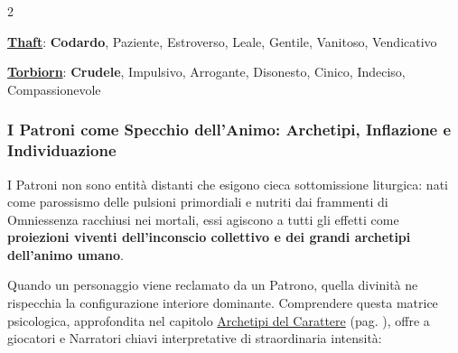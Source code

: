 \begin{multicols}{2}
{\smallskip
\textbf{\hyperlink{thaft}{Thaft}}: \textbf{Codardo}, Paziente, Estroverso, Leale, Gentile, Vanitoso, Vendicativo

\smallskip
\textbf{\hyperlink{torbiorn}{Torbiorn}}: \textbf{Crudele}, Impulsivo, Arrogante, Disonesto, Cinico, Indeciso, Compassionevole

}

\subsubsection{I Patroni come Specchio dell'Animo: Archetipi, Inflazione e Individuazione}\label{patroni-psicologia}\hypertarget{patroni-psicologia}{}

I Patroni non sono entità distanti che esigono cieca sottomissione liturgica: nati come parossismo delle pulsioni primordiali e nutriti dai frammenti di Omniessenza racchiusi nei mortali, essi agiscono a tutti gli effetti come \textbf{proiezioni viventi dell'inconscio collettivo e dei grandi archetipi dell'animo umano}.

Quando un personaggio viene reclamato da un Patrono, quella divinità ne rispecchia la configurazione interiore dominante. Comprendere questa matrice psicologica, approfondita nel capitolo \hyperlink{archetipi}{Archetipi del Carattere} (pag. \pageref{archetipi}), offre a giocatori e Narratori chiavi interpretative di straordinaria intensità:


\end{multicols}
